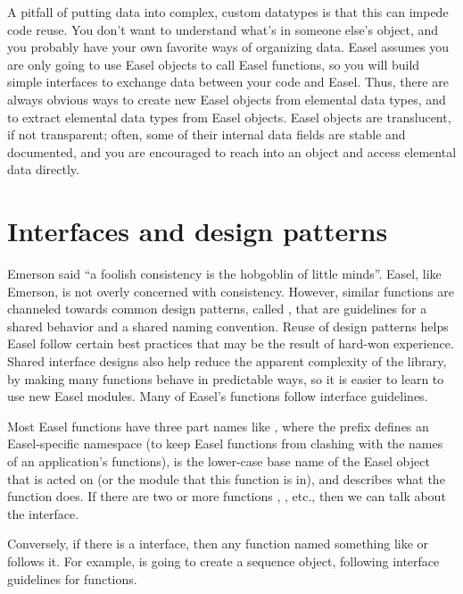A pitfall of putting data into complex, custom datatypes is that this
can impede code reuse. You don't want to understand what's in someone
else's object, and you probably have your own favorite ways of
organizing data.  Easel assumes you are only going to use Easel
objects to call Easel functions, so you will build simple interfaces
to exchange data between your code and Easel. Thus, there are always
obvious ways to create new Easel objects from elemental data types,
and to extract elemental data types from Easel objects. Easel objects
are translucent, if not transparent; often, some of their internal
data fields are stable and documented, and you are encouraged to reach
into an object and access elemental data directly.




\section{Interfaces and design patterns}

Emerson said ``a foolish consistency is the hobgoblin of little
minds''. Easel, like Emerson, is not overly concerned with
consistency. However, similar functions are channeled towards common
design patterns, called , that are guidelines for a
shared behavior and a shared naming convention. Reuse of design
patterns helps Easel follow certain best practices that may be the
result of hard-won experience. Shared interface designs also help
reduce the apparent complexity of the library, by making many
functions behave in predictable ways, so it is easier to learn to use
new Easel modules. Many of Easel's functions follow interface
guidelines.

Most Easel functions have three part names like
, where the  prefix defines an
Easel-specific namespace (to keep Easel functions from clashing with
the names of an application's functions),  is the
lower-case base name of the Easel object that is acted on (or the
module that this function is in), and  describes what
the function does.  If there are two or more functions
, , etc., then we
can talk about the  interface. 

Conversely, if there is a  interface, then any
function named something like  or
 follows it. For example,
 is going to create a 
sequence object, following interface guidelines for 
functions.

